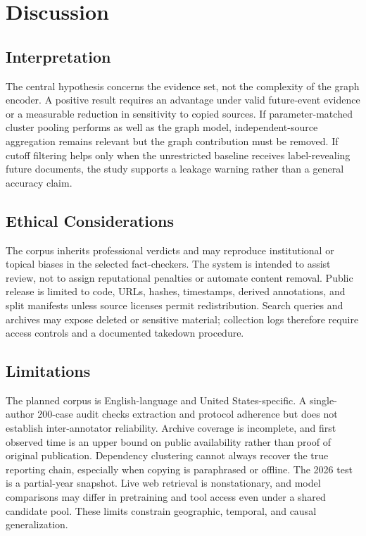 \section{Discussion}

\subsection{Interpretation}

The central hypothesis concerns the evidence set, not the complexity of the graph encoder. A positive result requires an advantage under valid future-event evidence or a measurable reduction in sensitivity to copied sources. If parameter-matched cluster pooling performs as well as the graph model, independent-source aggregation remains relevant but the graph contribution must be removed. If cutoff filtering helps only when the unrestricted baseline receives label-revealing future documents, the study supports a leakage warning rather than a general accuracy claim.

\subsection{Ethical Considerations}

The corpus inherits professional verdicts and may reproduce institutional or topical biases in the selected fact-checkers. The system is intended to assist review, not to assign reputational penalties or automate content removal. Public release is limited to code, URLs, hashes, timestamps, derived annotations, and split manifests unless source licenses permit redistribution. Search queries and archives may expose deleted or sensitive material; collection logs therefore require access controls and a documented takedown procedure.

\subsection{Limitations}

The planned corpus is English-language and United States-specific. A single-author 200-case audit checks extraction and protocol adherence but does not establish inter-annotator reliability. Archive coverage is incomplete, and first observed time is an upper bound on public availability rather than proof of original publication. Dependency clustering cannot always recover the true reporting chain, especially when copying is paraphrased or offline. The 2026 test is a partial-year snapshot. Live web retrieval is nonstationary, and model comparisons may differ in pretraining and tool access even under a shared candidate pool. These limits constrain geographic, temporal, and causal generalization.
